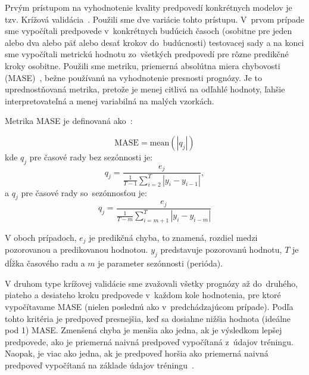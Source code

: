 \documentclass[thesismargins, thesislinespacing, openright, upjsfrontpage]{rnthesis}
\begin{document}

Prvým prístupom na vyhodnotenie kvality predpovedí konkrétnych modelov je tzv. Krížová validácia~\cite {hyndman2018forecasting}. Použili sme dve variácie tohto prístupu. V~prvom prípade sme vypočítali predpovede v~konkrétnych budúcich časoch (osobitne pre jeden alebo dva alebo päť alebo desať krokov do~budúcnosti) testovacej sady a na konci sme vypočítali metrickú hodnotu zo~všetkých predpovedí pre rôzne predikčné kroky osobitne. Použili sme metriku, priemerná absolútna miera chybovosti (MASE)~\cite{hyndman2006another}, bežne používanú na vyhodnotenie presnosti prognózy.
Je to uprednostňovaná metrika, pretože je menej citlivá na odľahlé hodnoty, ľahšie interpretovateľná a menej variabilná na malých vzorkách.

Metrika MASE je definovaná ako~\cite{hyndman2018forecasting}:

% 
\begin{equation}
\textrm{MASE} = \textrm{mean}(|q_j|)
\end{equation}
% 
kde $q_j$ pre časové rady bez sezónnosti je:
% 
\begin{equation} 
q_j= \frac{e_j}{\frac{1}{T-1} \sum_{i=2}^{T}|y_i - y_{i-1}|},
\end{equation}
% 
a $q_j$ pre časové rady so~sezónnosťou je:
% 
\begin{equation} 
q_j = \frac{e_j}{\frac{1}{T-m} \sum_{i=m+1}^{T}|y_i - y_{i-m}|}
\end{equation}

V oboch prípadoch, $e_j$ je predikčná chyba, to znamená, rozdiel medzi pozorovanou a predikovanou hodnotou. $y_j$ predstavuje pozorovanú hodnotu, $T$ je dĺžka časového radu a $m$ je parameter sezónnosti (perióda).

V druhom type krížovej validácie sme zvažovali všetky prognózy až do~druhého, piateho a desiateho kroku predpovede v~každom kole hodnotenia, pre ktoré vypočítavame MASE (nielen poslednú ako v~predchádzajúcom prípade). Podľa tohto kritéria je predpoveď presnejšia, keď sa dosiahne nižšia hodnota (ideálne pod 1) MASE. Zmenšená chyba je menšia ako jedna, ak je výsledkom lepšej predpovede, ako je priemerná naivná predpoveď vypočítaná z~údajov tréningu. Naopak, je viac ako jedna, ak je predpoveď horšia ako priemerná naivná predpoveď vypočítaná na základe údajov tréningu~\cite{hyndman2014measuring}.
\end{document}
